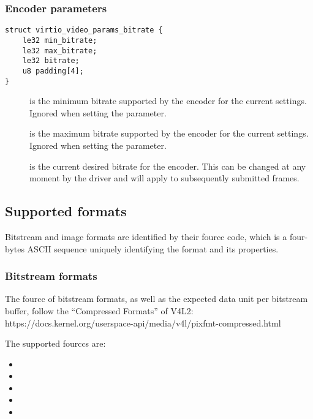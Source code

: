 \subsubsection{Encoder parameters}\label{sec:Device Types / Video Device / Parameters / Encoder parameters}

\begin{lstlisting}
struct virtio_video_params_bitrate {
    le32 min_bitrate;
    le32 max_bitrate;
    le32 bitrate;
    u8 padding[4];
}
\end{lstlisting}

\begin{description}
\item[]
is the minimum bitrate supported by the encoder for the current
settings. Ignored when setting the parameter.
\item[]
is the maximum bitrate supported by the encoder for the current
settings. Ignored when setting the parameter.
\item[]
is the current desired bitrate for the encoder. This can be changed at
any moment by the driver and will apply to subsequently submitted
frames.
\end{description}

\subsection{Supported formats}\label{sec:Device Types / Video Device / Supported formats}

Bitstream and image formats are identified by their fourcc code, which
is a four-bytes ASCII sequence uniquely identifying the format and its
properties.

\subsubsection{Bitstream formats}\label{sec:Device Types / Video Device / Supported formats / Bitstream formats}

The fourcc of bitstream formats, as well as the expected data unit per
bitstream buffer, follow the ``Compressed Formats'' of V4L2:
https://docs.kernel.org/userspace-api/media/v4l/pixfmt-compressed.html

The supported fourccs are:

\begin{itemize}
\item
\item
\item
\item
\item
\end{itemize}

